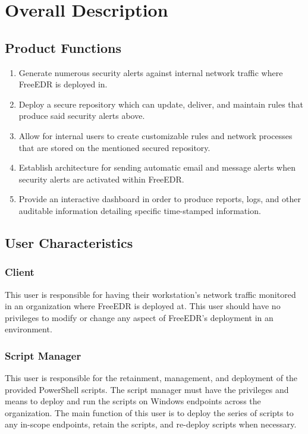 \documentclass{scrreprt}
\begin{document}
\chapter{Overall Description}

\section{Product Functions}

\begin{enumerate}
\item Generate numerous security alerts against internal network traffic where FreeEDR is deployed in.
\item Deploy a secure repository which can update, deliver, and maintain rules that produce said security alerts above. 
\item Allow for internal users to create customizable rules and network processes that are stored on the mentioned secured repository. 
\item Establish architecture for sending automatic email and message alerts when security alerts are activated within FreeEDR.
\item Provide an interactive dashboard in order to produce reports, logs, and other auditable information detailing specific time-stamped information.

\end{enumerate}

\section{User Characteristics}

\subsection{Client}
This user is responsible for having their workstation’s network traffic monitored in an organization where FreeEDR is deployed at. This user should have no privileges to modify or change any aspect of FreeEDR’s deployment in an environment. 

\subsection{Script Manager}
This user is responsible for the retainment, management, and deployment of the provided PowerShell scripts. The script manager must have the privileges and means to deploy and run the scripts on Windows endpoints across the organization. The main function of this user is to deploy the series of scripts to any in-scope endpoints, retain the scripts, and re-deploy scripts when necessary.
\end{document}
